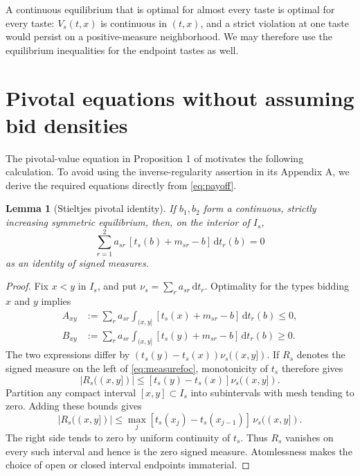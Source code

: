 \documentclass[11pt,a4paper]{article}
\numberwithin{equation}{section}
\newtheorem{lemma}[theorem]{Lemma}
\theoremstyle{definition}
\theoremstyle{remark}
\begin{document}
A continuous equilibrium that is optimal for almost every taste is optimal for every taste: $V_s(t,x)$ is continuous in $(t,x)$, and a strict violation at one taste would persist on a positive-measure neighborhood. We may therefore use the equilibrium inequalities for the endpoint tastes as well.

\section{Pivotal equations without assuming bid densities}
\label{sec:measurefoc}

The pivotal-value equation in Proposition 1 of \cite[p.~504]{PS2000} motivates the following calculation. To avoid using the inverse-regularity assertion in its Appendix A, we derive the required equations directly from \eqref{eq:payoff}.

\begin{lemma}[Stieltjes pivotal identity]
\label{lem:measurefoc}
If $b_1,b_2$ form a continuous, strictly increasing symmetric equilibrium, then, on the interior of $I_s$,
\begin{equation}
\label{eq:measurefoc}
 \sum_{r=1}^2 a_{sr}\,[t_s(b)+m_{sr}-b]\,\mathrm dt_r(b)=0
\end{equation}
as an identity of signed measures.
\end{lemma}
\begin{proof}
Fix $x<y$ in $I_s$, and put $\nu_s=\sum_r a_{sr}\,\mathrm dt_r$. Optimality for the types bidding $x$ and $y$ implies
\begin{align*}
 A_{xy}&:=\sum_r a_{sr}\int_{(x,y]}[t_s(x)+m_{sr}-b]\,\mathrm dt_r(b)\le0,\\
 B_{xy}&:=\sum_r a_{sr}\int_{(x,y]}[t_s(y)+m_{sr}-b]\,\mathrm dt_r(b)\ge0.
\end{align*}
The two expressions differ by $(t_s(y)-t_s(x))\nu_s((x,y])$. If $R_s$ denotes the signed measure on the left of \eqref{eq:measurefoc}, monotonicity of $t_s$ therefore gives
\[
 |R_s((x,y])|\le [t_s(y)-t_s(x)]\nu_s((x,y]).
\]
Partition any compact interval $[x,y]\subset I_s$ into subintervals with mesh tending to zero. Adding these bounds gives
\[
 |R_s((x,y])|\le
 \max_j[t_s(x_j)-t_s(x_{j-1})]\,\nu_s((x,y]).
\]
The right side tends to zero by uniform continuity of $t_s$. Thus $R_s$ vanishes on every such interval and hence is the zero signed measure. Atomlessness makes the choice of open or closed interval endpoints immaterial.
\end{proof}
\end{document}
